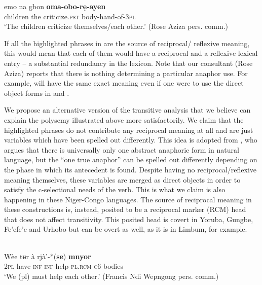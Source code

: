 \documentclass[output=paper]{langsci/langscibook}
\begin{document}
  \ex\label{ex:safir:5d}
  \gll emo    na    gbon     \textbf{oma-obo-rẹ-ayen} \\
	children  the  criticize.\textsc{pst}   body-hand-of-\textsc{3pl}\\
  \glt   ‘The children criticize themselves/each other.’ (Rose Aziza pers. comm.)
  \z
\z
 
If all the highlighted phrases in  are the source of reciprocal/ reflexive meaning, this would mean that each of them would have a reciprocal and a reflexive lexical entry – a substantial redundancy in the lexicon. Note that our consultant (Rose Aziza) reports that there is nothing determining a particular anaphor use. For example,  will have the same exact meaning even if one were to use the direct object forms in  and . 

We propose an alternative version of the transitive analysis that we believe can explain the polysemy illustrated above more satisfactorily. We claim that the highlighted phrases do not contribute any reciprocal meaning at all and are just variables which have been spelled out differently. This idea is adopted from \citet{Safir2014}, who argues that there is universally only one abstract anaphoric form in natural language, but the “one true anaphor” can be spelled out differently depending on the phase in which its antecedent is found. Despite having no reciprocal/reflexive meaning themselves, these variables are merged as direct objects in order to satisfy the c-selectional needs of the verb. This is what we claim is also happening in these Niger-Congo languages. The source of reciprocal meaning in these constructions is, instead, posited to be a reciprocal marker (RCM) head that does not affect transitivity. This posited head is covert in Yoruba, Gungbe, Fe'efe'e and Urhobo but can be overt as well, as it is in Limbum, for example.


\ea\label{ex:safir:6}
\\
\gll Wèe  tʉr  à  rjà’-*(\textbf{se})    \textbf{{mnyor}} \\
\textsc{2pl}  have  \textsc{inf}  \textsc{inf}-help-\textsc{pl.rcm}  \textsc{c}6-bodies \\
\glt ‘We (pl) must help each other.’ {(}Francis Ndi Wepngong pers. comm.{)} 
\z
\end{document}
